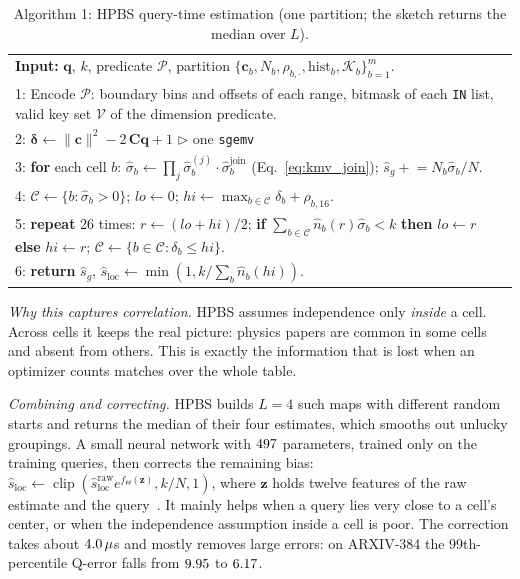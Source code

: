 \documentclass[sigconf, nonacm]{acmart}
\begin{document}
\begin{table}[!t]
\footnotesize
\centering
\caption{Algorithm 1: HPBS query-time estimation (one partition; the sketch returns the median over $L$).}
\label{alg:hpbs}
\begin{tabular}{p{}}
\toprule
\textbf{Input:} $\mathbf{q}$, $k$, predicate $\mathcal{P}$, partition $\{\mathbf{c}_b, N_b, \rho_{b,\cdot}, \text{hist}_b, \mathcal{K}_b\}_{b=1}^m$.\\
1: Encode $\mathcal{P}$: boundary bins and offsets of each range, bitmask of each \texttt{IN} list, valid key set $\mathcal{V}$ of the dimension predicate.\\
2: $\boldsymbol{\delta}\leftarrow \|\mathbf{c}\|^2 - 2\,\mathbf{C}\mathbf{q} + 1$ \hfill $\triangleright$ one \texttt{sgemv}\\
3: \textbf{for} each cell $b$: $\hat\sigma_b\leftarrow\prod_j\hat\sigma_b^{(j)}\cdot\hat\sigma_b^{\text{join}}$ (Eq.~\eqref{eq:kmv_join}); $\hat s_g \mathrel{+}= N_b\hat\sigma_b/N$.\\
4: $\mathcal{C}\leftarrow\{b:\hat\sigma_b>0\}$; $lo\leftarrow0$; $hi\leftarrow\max_{b\in\mathcal{C}}\delta_b+\rho_{b,16}$.\\
5: \textbf{repeat} 26 times: $r\leftarrow(lo+hi)/2$; \textbf{if} $\sum_{b\in\mathcal{C}}\hat n_b(r)\hat\sigma_b<k$ \textbf{then} $lo\leftarrow r$ \textbf{else} $hi\leftarrow r$; $\mathcal{C}\leftarrow\{b\in\mathcal{C}:\delta_b\le hi\}$.\\
6: \textbf{return} $\hat s_g$, $\hat s_{\text{loc}}\leftarrow\min(1, k/\sum_b\hat n_b(hi))$.\\
\bottomrule
\end{tabular}
\end{table}

\emph{Why this captures correlation.} HPBS assumes independence only \emph{inside} a cell. Across cells it keeps the real picture: physics papers are common in some cells and absent from others. This is exactly the information that is lost when an optimizer counts matches over the whole table.

\emph{Combining and correcting.} HPBS builds $L=4$ such maps with different random starts and returns the median of their four estimates, which smooths out unlucky groupings. A small neural network with $497$ parameters, trained only on the training queries, then corrects the remaining bias: $\hat s_{\text{loc}}\leftarrow\operatorname{clip}(\hat s^{\text{raw}}_{\text{loc}}e^{f_\Theta(\mathbf{z})},k/N,1)$, where $\mathbf{z}$ holds twelve features of the raw estimate and the query~\cite{hvoextended}. It mainly helps when a query lies very close to a cell's center, or when the independence assumption inside a cell is poor. The correction takes about $4.0\,\mu$s and mostly removes large errors: on ARXIV-384 the 99th-percentile Q-error falls from $9.95$ to $6.17$.
\end{document}
